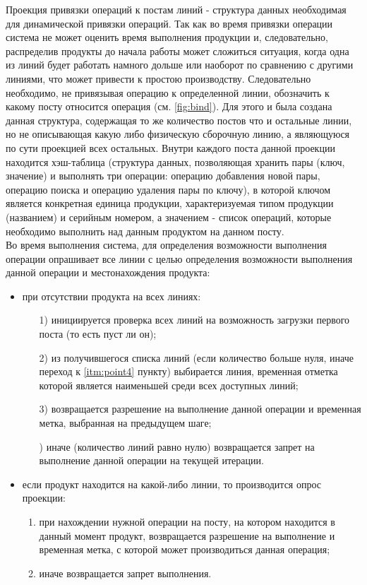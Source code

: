 \indent Проекция привязки операций к постам линий - структура данных необходимая для динамической привязки операций.
Так как во время привязки операции система не может оценить время выполнения продукции и, следовательно, распределив продукты до начала работы может сложиться ситуация, когда одна из линий будет работать намного дольше или наоборот по сравнению с другими линиями, что может привести к простою производству.
Следовательно необходимо, не привязывая операцию к определенной линии, обозначить к какому посту относится операция (см. \ref{fig:bind}).
Для этого и была создана данная структура, содержащая то же количество постов что и остальные линии, но не описывающая какую либо физическую сборочную линию, а являющуюся по сути проекцией всех остальных.
Внутри каждого поста данной проекции находится хэш-таблица (структура данных, позволяющая хранить пары (ключ, значение) и выполнять три операции: операцию добавления новой пары, операцию поиска и операцию удаления пары по ключу), в которой ключом является конкретная единица продукции, характеризуемая типом продукции (названием) и серийным номером, а значением - список операций, которые необходимо выполнить над данным продуктом на данном посту.\\
\indent Во время выполнения система, для определения возможности выполнения операции опрашивает все линии с целью определения возможности выполнения данной операции и местонахождения продукта:

\begin{itemize}
	\item при отсутствии продукта на всех линиях:
		\begin{enumerate}
			\item[1)] инициируется проверка всех линий на возможность загрузки первого поста (то есть пуст ли он);
			\item[2)] из получившегося списка линий (если количество больше нуля, иначе переход к \ref{itm:point4} пункту) выбирается линия, временная отметка которой является наименьшей среди всех доступных линий;
			\item[3)] возвращается разрешение на выполнение данной операции и временная метка, выбранная на предыдущем шаге;
			\item[\mylabel{itm:point4}{4})] иначе (количество линий равно нулю) возвращается запрет на выполнение данной операции на текущей итерации.
		\end{enumerate}
	\item если продукт находится на какой-либо линии, то производится опрос проекции:
		\begin{enumerate}
			\item при нахождении нужной операции на посту, на котором находится в данный момент продукт, возвращается разрешение на выполнение и временная метка, с которой может производиться данная операция;
			\item иначе возвращается запрет выполнения.
		\end{enumerate}
\end{itemize}

